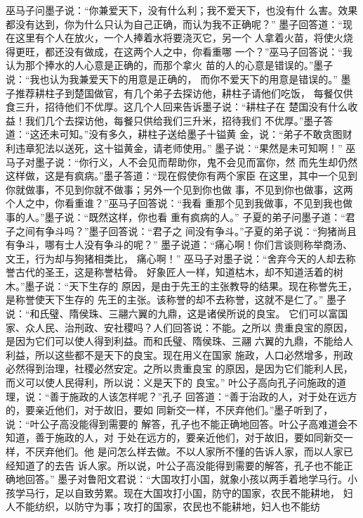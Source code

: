\documentclass[12pt,UTF8]{ctexbook}
\begin{document}
巫马子问墨子说：“你兼爱天下，没有什么利；我不爱天下，也没有什 
么害。效果都没有达到，你为什么只认为自己正确，而认为我不正确呢？” 
墨子回答道：“现在这里有个人在放火，一个人捧着水将要浇灭它，另一个 
人拿着火苗，将使火烧得更旺，都还没有做成，在这两个人之中，你看重哪 
一个？”巫马子回答说：“我认为那个捧水的人心意是正确的，而那个拿火 
苗的人的心意是错误的。”墨子说：“我也认为我兼爱天下的用意是正确的， 
而你不爱天下的用意是错误的。” 
墨子推荐耕柱子到楚国做官，有几个弟子去探访他，耕柱子请他们吃饭， 
每餐仅供食三升，招待他们不优厚。这几个人回来告诉墨子说：“耕柱子在 
楚国没有什么收益！我们几个去探访他，每餐只供给我们三升米，招待我们 
不优厚。”墨子答道：“这还未可知。”没有多久，耕柱子送给墨子十镒黄 
金，说：“弟子不敢贪图财利违章犯法以送死，这十镒黄金，请老师使用。” 
墨子说：“果然是未可知啊！” 
巫马子对墨子说：“你行义，人不会见而帮助你，鬼不会见而富你，然 
而先生却仍然这样做，这是有疯病。”墨子答道：“现在假使你有两个家臣 
在这里，其中一个见到你就做事，不见到你就不做事；另外一个见到你也做 
事，不见到你也做事，这两个人之中，你看重谁？”巫马子回答说：“我看 
重那个见到我做事，不见到我也做事的人。”墨子说：“既然这样，你也看 
重有疯病的人。” 
子夏的弟子问墨子道：“君子之间有争斗吗？”墨子回答说：“君子之 
间没有争斗。”子夏的弟子说：“狗猪尚且有争斗，哪有士人没有争斗的呢？” 
墨子说道：“痛心啊！你们言谈则称举商汤、文王，行为却与狗猪相类比， 
痛心啊！” 
巫马子对墨子说：“舍弃今天的人却去称誉古代的圣王，这是称誉枯骨。 
好象匠人一样，知道枯木，却不知道活着的树木。”墨子说：“天下生存的 
原因，是由于先王的主张教导的结果。现在称誉先王，是称誉使天下生存的 
先王的主张。该称誉的却不去称誉，这就不是仁了。” 
墨子说：“和氏璧、隋侯珠、三翮六翼的九鼎，这是诸侯所说的良宝。 
它们可以富国家、众人民、治刑政、安社稷吗？人们回答说：不能。之所以 
贵重良宝的原因，是因为它们可以使人得到利益。而和氏璧、隋侯珠、三翮 
六翼的九鼎，不能给人利益，所以这些都不是天下的良宝。现在用义在国家 
施政，人口必然增多，刑政必然得到治理，社稷必然安定。之所以贵重良宝 
的原因，是因为它们能利人民，而义可以使人民得利，所以说：义是天下的 
良宝。” 
叶公子高向孔子问施政的道理，说：“善于施政的人该怎样呢？”孔子 
回答道：“善于治政的人，对于处在远方的，要亲近他们，对于故旧，要如 
同新交一样，不厌弃他们。”墨子听到了，说：“叶公子高没能得到需要的 
解答，孔子也不能正确地回答。叶公子高难道会不知道，善于施政的人，对 
于处在远方的，要亲近他们，对于故旧，要如同新交一样，不厌弃他们。他 
是问怎么样去做。不以人家所不懂的告诉人家，而以人家已经知道了的去告 
诉人家。所以说，叶公子高没能得到需要的解答，孔子也不能正确地回答。” 
墨子对鲁阳文君说：“大国攻打小国，就象小孩以两手着地学马行。小 
孩学马行，足以自致劳累。现在大国攻打小国，防守的国家，农民不能耕地， 
妇人不能纺织，以防守为事；攻打的国家，农民也不能耕地，妇人也不能纺 
\end{document}
